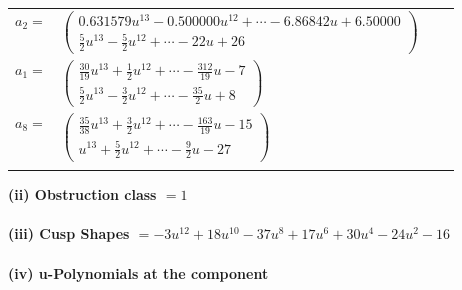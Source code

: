 \documentclass[1p]{elsarticle_modified}
\theoremstyle{definition}
\begin{document}
\begin{tabular}{m{7pt} m{180pt} m{7pt} m{180pt} }
\flushright $a_{2}=$&$\begin{pmatrix}0.631579 u^{13}-0.500000 u^{12}+\cdots-6.86842 u+6.50000\\\frac{5}{2} u^{13}-\frac{5}{2} u^{12}+\cdots-22 u+26\end{pmatrix}$ \\
\flushright $a_{1}=$&$\begin{pmatrix}\frac{30}{19} u^{13}+\frac{1}{2} u^{12}+\cdots-\frac{312}{19} u-7\\\frac{5}{2} u^{13}-\frac{3}{2} u^{12}+\cdots-\frac{35}{2} u+8\end{pmatrix}$ \\
\flushright $a_{8}=$&$\begin{pmatrix}\frac{35}{38} u^{13}+\frac{3}{2} u^{12}+\cdots-\frac{163}{19} u-15\\u^{13}+\frac{5}{2} u^{12}+\cdots-\frac{9}{2} u-27\end{pmatrix}$\\&\end{tabular}
\flushleft \textbf{(ii) Obstruction class $= 1$}\\~\\
\flushleft \textbf{(iii) Cusp Shapes $= -3 u^{12}+18 u^{10}-37 u^8+17 u^6+30 u^4-24 u^2-16$}\\~\\
\newpage\renewcommand{\arraystretch}{1}
\flushleft \textbf{(iv) u-Polynomials at the component}\newline \\
\end{document}
